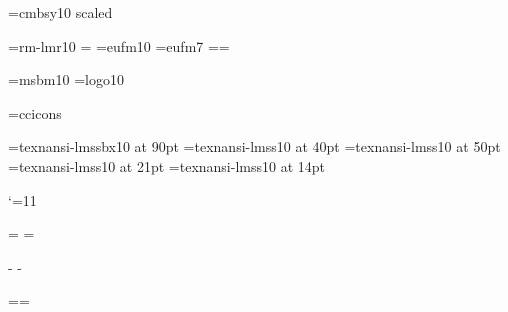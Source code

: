 






\newdimen\hpage \newdimen\vpage %

\newif\ifportada \portadatrue

\def\[{\string\[} %



\font\fonttwosym=cmbsy10 scaled
\def\Stitle{{\fonttwosym \char"78}}

\lmfonts\lmtitles\ansifont
 \font\tenrm=rm-lmr10 =\tenrm
\font\frakx=eufm10
\font\frakvii=eufm7
\newfam\frakfam \textfont\frakfam=\frakx \scriptfont\frakfam=\frakvii
\def\frak{\fam\frakfam\frakx}

\font\msbm=msbm10
\font\logo=logo10

\font\ccicons=ccicons
\def\ccbysa{{\ccicons \char0\kern1pt\char1\kern1pt\char2}}

\font\ptitlefont=texnansi-lmssbx10 at 90pt
\font\psubtitlefont=texnansi-lmss10 at 40pt
\font\pauthorfont=texnansi-lmss10 at 50pt
\font\pcitefont=texnansi-lmss10 at 21pt
\font\ptextfont=texnansi-lmss10 at 14pt

\def\pdfBlack{\pdfliteral{0 0 0 1 k 0 0 0 1 K}}
\def\pdfWhite{\pdfliteral{0 0 0 0 k 0 0 0 0 K}}
\def\pdfRed{\pdfliteral{0 1 1 0 k 0 1 1 0 K}}
\def\pdfBlue{\pdfliteral{1 1 0 0 k 1 1 0 0 K}}
\def\pdfGreen{\pdfliteral{1 0 1 0 k 1 0 1 0 K}}

\catcode`\@=11


\let\docinfo\relax \let\infodoc\relax

\headline={\hfil}
\footline={\tenrm\ifodd\pageno \docinfo\hfil\folio
            \else \folio\hfil\infodoc \fi\strut}

\hpage=6in \hsize=10.5cm
 \hoffset\hpage \advance\hoffset-\hsize \divide{}
 \advance\hoffset-1in
\vpage=9in \baselineskip \advance\vsize\topskip %
 \voffset\vpage \advance\voffset-\vsize \advance{}\baselineskip
 \divide{} \advance\voffset-1in

\pdfcode \pdfpageheight=\vpage \pdfpagewidth=\hpage \pdfendcode

\]
